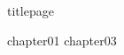 \documentclass[
	,a4paper
	,12pt
	,oneside
]{book}
\begin{document}
\frontmatter

	{titlepage}
	\tableofcontents

\mainmatter

{chapter01}
{chapter03}


\backmatter
\end{document}
